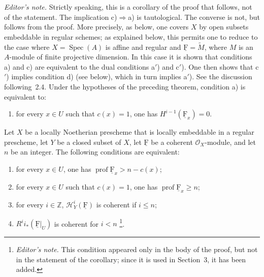 \documentclass[10pt,a4paper]{article}
\newcommand{\uF}{\underline{\mathrm F}}
\newcommand{\cF}{\uF}
\newcommand{\prof}{\operatorname{prof}}
\newcommand{\markedfootnote}[2]{\begingroup\renewcommand{\thefootnote}{#1}\footnote{#2}\endgroup}
\theoremstyle{sgatheorem}
\theoremstyle{plain}
\numberwithin{equation}{section}
\newcounter{sourcecorollary}[section]
\begin{document}

\setcounter{section}{2}
\setcounter{sourcecorollary}{1}
\begin{sourcecorollary}{\textit{Editor's note.} Strictly speaking, this is a
corollary of the proof that follows, not of the statement. The implication
\textup{c)}$\Rightarrow$\textup{a)} is tautological. The converse is not, but
follows from the proof. More precisely, as below, one covers $X$ by open
subsets embeddable in regular schemes; as explained below, this permits one to
reduce to the case where $X=\operatorname{Spec}(A)$ is affine and regular and
$\cF=\widetilde M$, where $M$ is an $A$-module of finite projective dimension.
In this case it is shown that conditions \textup{a)} and \textup{c)} are
equivalent to the dual conditions \textup{a$'$)} and \textup{c$'$)}. One then
shows that \textup{c$'$)} implies condition \textup{d)} (see below), which in
turn implies \textup{a$'$)}. See the discussion following~2.4.}\label{VIII.2.2}
Under the hypotheses of the preceding theorem, condition \textup{a)} is
equivalent to:
\begin{enumerate}[label=\textup{\alph*)},start=3,leftmargin=2.2em]
\item for every $x\in U$ such that $c(x)=1$, one has
  $H^{i-1}(\cF_x)=0$.
\end{enumerate}
\end{sourcecorollary}


\setcounter{section}{2}
\setcounter{sourcecorollary}{2}
\begin{sourcecorollary}\label{VIII.2.3}
Let $X$ be a locally Noetherian prescheme that is locally embeddable in a
regular prescheme, let $Y$ be a closed subset of $X$, let $\cF$ be a coherent
$\mathcal O_X$-module, and let $n$ be an integer. The following conditions are
equivalent:
\begin{enumerate}[label=\textup{(\roman*)},leftmargin=2.8em]
\item for every $x\in U$, one has
  $\prof \cF_x>n-c(x)$;
\item for every $x\in U$ such that $c(x)=1$, one has
  $\prof \cF_x\geq n$;
\item for every $i\in\mathbb Z$, $\mathcal H^i_Y(\cF)$ is coherent if
  $i\leq n$;
\item $R^i i_*(\cF|_U)$ is coherent for $i<n$%
  \markedfootnote{(4)}{\textit{Editor's note.} This condition appeared only
  in the body of the proof, but not in the statement of the corollary; since
  it is used in Section~3, it has been added.}.
\end{enumerate}
\end{sourcecorollary}
\end{document}
